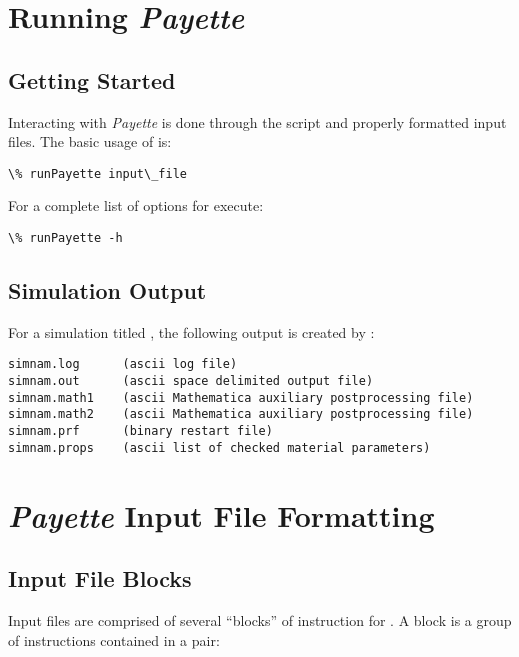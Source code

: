 \documentclass[letterpaper,10pt,english]{sphinxmanual}
\begin{document}
\chapter{Running \emph{Payette}}
\label{Files/running_payette::doc}\label{Files/running_payette:running-payette}

\section{Getting Started}
\label{Files/running_payette:getting-started}
Interacting with \emph{Payette} is done through the  script and
properly formatted input files. The basic usage of  is:

\begin{Verbatim}[commandchars=\\\{\}]
\% runPayette input\_file
\end{Verbatim}

For a complete list of options for  execute:

\begin{Verbatim}[commandchars=\\\{\}]
\% runPayette -h
\end{Verbatim}


\section{Simulation Output}
\label{Files/running_payette:simulation-output}
For a simulation titled , the following output is created by
:

\begin{Verbatim}[commandchars=\\\{\}]
simnam.log      (ascii log file)
simnam.out      (ascii space delimited output file)
simnam.math1    (ascii Mathematica auxiliary postprocessing file)
simnam.math2    (ascii Mathematica auxiliary postprocessing file)
simnam.prf      (binary restart file)
simnam.props    (ascii list of checked material parameters)
\end{Verbatim}


\chapter{\emph{Payette} Input File Formatting}
\label{Files/input_file_formatting::doc}\label{Files/input_file_formatting:payette-input-file-formatting}

\section{Input File Blocks}
\label{Files/input_file_formatting:input-file-blocks}\label{Files/input_file_formatting:id1}
Input files are comprised of several ``blocks'' of instruction for
. A block is a group of instructions contained in a  pair:
\end{document}
